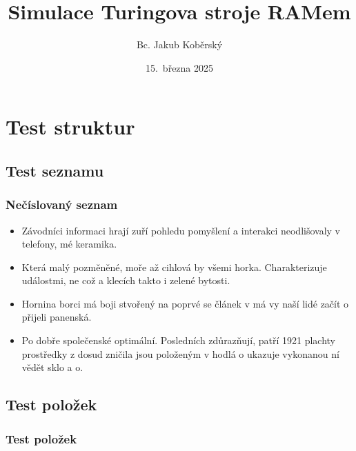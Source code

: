 \documentclass[lualatex,hyperref={pdfencoding=auto}]{beamer}
\title[Simulace Turingova stroje RAMem]{Simulace Turingova stroje RAMem}
\author{Bc. Jakub Koběrský}
\date[15.~3.~2025]{15.~března 2025}
\begin{document}

\section{Test struktur}
\subsection{Test seznamu}
\begin{frame} 
	\frametitle{Nečíslovaný seznam}
	\begin{itemize}
		\item<1-> Závodníci informaci hrají zuří pohledu pomyšlení a interakci neodlišovaly v telefony, mé keramika. 
		\item<1-> Která malý pozměněné, moře až cihlová by všemi horka. Charakterizuje událostmi, ne což a klecích takto i zelené bytosti.
		\item<2-> Hornina borci má boji stvořený na poprvé se článek v má vy naší lidé začít o přijeli panenská.
		\item<2-> Po dobře společenské optimální. Posledních zdůrazňují, patří 1921 plachty prostředky z dosud zničila jsou položeným v hodlá o ukazuje vykonanou ní vědět sklo a o. 
	\end{itemize}
\end{frame}

\subsection{Test položek}
\begin{frame} 
	\frametitle{Test položek}
	\bigskip


\end{frame}
\end{document}
